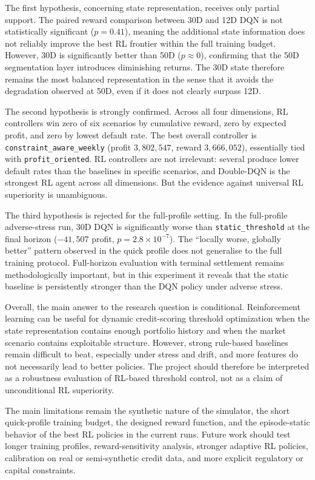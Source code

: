 \documentclass[12pt,a4paper]{article}
\begin{document}
The first hypothesis, concerning state representation, receives only partial support. The paired reward comparison between 30D and 12D DQN is not statistically significant ($p = 0.41$), meaning the additional state information does not reliably improve the best RL frontier within the full training budget. However, 30D is significantly better than 50D ($p \approx 0$), confirming that the 50D segmentation layer introduces diminishing returns. The 30D state therefore remains the most balanced representation in the sense that it avoids the degradation observed at 50D, even if it does not clearly surpass 12D.

The second hypothesis is strongly confirmed. Across all four dimensions, RL controllers win zero of six scenarios by cumulative reward, zero by expected profit, and zero by lowest default rate. The best overall controller is \texttt{constraint\_aware\_weekly} (profit $3{,}802{,}547$, reward $3{,}666{,}052$), essentially tied with \texttt{profit\_oriented}. RL controllers are not irrelevant: several produce lower default rates than the baselines in specific scenarios, and Double-DQN is the strongest RL agent across all dimensions. But the evidence against universal RL superiority is unambiguous.

The third hypothesis is rejected for the full-profile setting. In the full-profile adverse-stress run, 30D DQN is significantly worse than \texttt{static\_threshold} at the final horizon ($-41{,}507$ profit, $p = 2.8 \times 10^{-7}$). The ``locally worse, globally better'' pattern observed in the quick profile does not generalise to the full training protocol. Full-horizon evaluation with terminal settlement remains methodologically important, but in this experiment it reveals that the static baseline is persistently stronger than the DQN policy under adverse stress.

Overall, the main answer to the research question is conditional. Reinforcement learning can be useful for dynamic credit-scoring threshold optimization when the state representation contains enough portfolio history and when the market scenario contains exploitable structure. However, strong rule-based baselines remain difficult to beat, especially under stress and drift, and more features do not necessarily lead to better policies. The project should therefore be interpreted as a robustness evaluation of RL-based threshold control, not as a claim of unconditional RL superiority.

The main limitations remain the synthetic nature of the simulator, the short quick-profile training budget, the designed reward function, and the episode-static behavior of the best RL policies in the current runs. Future work should test longer training profiles, reward-sensitivity analysis, stronger adaptive RL policies, calibration on real or semi-synthetic credit data, and more explicit regulatory or capital constraints.
\end{document}
